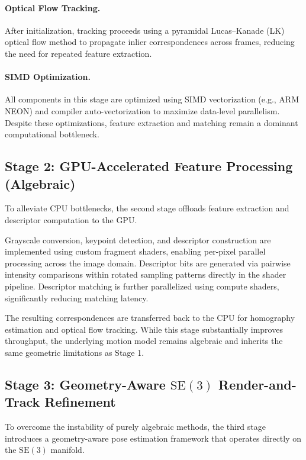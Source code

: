 \paragraph{Optical Flow Tracking.}
After initialization, tracking proceeds using a pyramidal Lucas--Kanade (LK) optical flow method to propagate inlier correspondences across frames, reducing the need for repeated feature extraction.

\paragraph{SIMD Optimization.}
All components in this stage are optimized using SIMD vectorization (e.g., ARM NEON) and compiler auto-vectorization to maximize data-level parallelism. Despite these optimizations, feature extraction and matching remain a dominant computational bottleneck.

\subsection{Stage 2: GPU-Accelerated Feature Processing (Algebraic)}

To alleviate CPU bottlenecks, the second stage offloads feature extraction and descriptor computation to the GPU.

Grayscale conversion, keypoint detection, and descriptor construction are implemented using custom fragment shaders, enabling per-pixel parallel processing across the image domain. Descriptor bits are generated via pairwise intensity comparisons within rotated sampling patterns directly in the shader pipeline. Descriptor matching is further parallelized using compute shaders, significantly reducing matching latency.

The resulting correspondences are transferred back to the CPU for homography estimation and optical flow tracking. While this stage substantially improves throughput, the underlying motion model remains algebraic and inherits the same geometric limitations as Stage 1.

\subsection{Stage 3: Geometry-Aware $\mathrm{SE}(3)$ Render-and-Track Refinement}

To overcome the instability of purely algebraic methods, the third stage introduces a geometry-aware pose estimation framework that operates directly on the $\mathrm{SE}(3)$ manifold.

